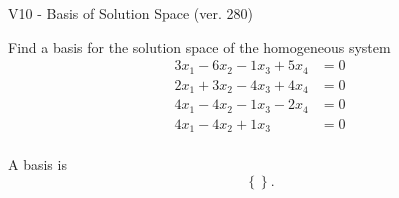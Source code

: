 \begin{exercise}
  \begin{exerciseTitle}V10 - Basis of Solution Space (ver. 280)\end{exerciseTitle}
  \begin{exerciseStatement}
    Find a basis for the solution space of the homogeneous system 
\begin{align*}
 3 x_ 1 -6 x_ 2 -1 x_ 3 + 5 x_ 4 &= 0  \\ 
  2 x_ 1 + 3 x_ 2 -4 x_ 3 + 4 x_ 4 &= 0  \\ 
  4 x_ 1 -4 x_ 2 -1 x_ 3 -2 x_ 4 &= 0  \\ 
  4 x_ 1 -4 x_ 2 + 1 x_ 3 &= 0  \\ 
 \end{align*}


 
  \end{exerciseStatement}

  \begin{exerciseAnswer}
   A basis is   
\[\left\{\right\}.\]

  


  \end{exerciseAnswer}
\end{exercise}
